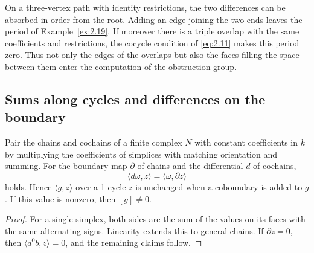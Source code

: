 \begin{example}\label{ex:2.27}

On a three-vertex path with identity restrictions, the two differences can be absorbed in
order from the root. Adding an edge joining the two ends leaves the period of
Example~\ref{ex:2.19}. If moreover there is a triple overlap with the same coefficients
and restrictions, the cocycle condition of \eqref{eq:2.11} makes this period zero. Thus
not only the edges of the overlaps but also the faces filling the space between them enter
the computation of the obstruction group.

\end{example}

\subsection*{Sums along cycles and differences on the boundary}

\begin{proposition}\label{prop:2.28}

Pair the chains and cochains of a finite complex $N$ with constant coefficients in $k$ by
multiplying the coefficients of simplices with matching orientation and summing. For the
boundary map $\partial$ of chains and the differential $d$ of cochains,
\begin{equation*}
\langle d\omega,z\rangle=\langle\omega,\partial z\rangle
\tag{2.18}\label{eq:2.18}
\end{equation*}
holds. Hence $\langle g,z\rangle$ over a 1-cycle $z$ is unchanged when a coboundary is
added to $g$. If this value is nonzero, then $[g]\ne0$.

\end{proposition}

\begin{proof}

For a single simplex, both sides are the sum of the values on its faces with the same
alternating signs. Linearity extends this to general chains. If $\partial z=0$, then
$\langle d^0b,z\rangle=0$, and the remaining claims follow.

\end{proof}

